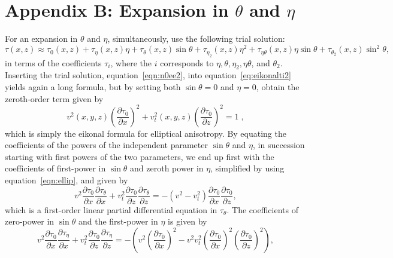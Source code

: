 \appendix
\section{Appendix B: Expansion in $\theta$ and $\eta$}

For an expansion in $\theta$ and $\eta$, simultaneously,   use the following trial solution:
 \begin{equation}
 \tau(x,z) \approx \tau_{0}(x,z) +\tau_{\eta}(x,z) \eta+\tau_{\theta}(x,z) \sin\theta+ \tau_{\eta_2}(x,z)  \eta^{2}+ \tau_{\eta \theta}(x,z)  \eta \sin\theta+ \tau_{\theta_2}(x,z)  \sin^{2}\theta,
\label{eqn:n0ee2}
\end{equation}
in terms of the coefficients $\tau_{i}$, where the $i$ corresponds to $\eta,\theta,\eta_2,\eta \theta$, and $\theta_2$. 
Inserting the trial solution, equation~\ref{eqn:n0ee2}, into equation~\ref{eq:eikonalti2} yields again a long formula, 
but by setting both $\sin\theta=0$ and $\eta=0$,
  obtain the zeroth-order term given by
\begin{equation}
v^2(x,y,z) \left(\frac{\partial \tau_{0}}{\partial x}\right)^2  +
v_t^2(x,y,z) \left(\frac{\partial \tau_{0}}{\partial z}\right)^2 = 1\;,
\label{eqn:ellip}
\end{equation}
which is simply the eikonal formula for elliptical anisotropy. By equating the coefficients of the powers 
of the independent parameter $\sin\theta$ and $\eta$, in succession starting with first powers of the two parameters,
we end up first with the coefficients of first-power in $\sin\theta$ and zeroth power in $\eta$, 
simplified by using equation~\ref{eqn:ellip}, and  given by
\begin{equation}
 v^2 \frac{\partial \tau_{0}}{\partial x} \frac{\partial \tau_{\theta}}{\partial x}+ v_t^2 \frac{\partial \tau_{0}}{\partial z} \frac{\partial \tau
   _{\theta}}{\partial z} = - \left(v^2-v_t^{2}\right)
   \frac{\partial \tau_{0}}{\partial x} \frac{\partial \tau_{0}}{\partial
   z},
\label{eqn:fordert}
\end{equation}
which is a first-order linear partial differential equation in $\tau_{\theta}$. The 
coefficients of zero-power in $\sin\theta$ and the first-power in $\eta$ is given by
\begin{equation}
v^2
   \frac{\partial \tau_{0}}{\partial x} \frac{\partial \tau_{\eta}}{\partial
   x}+v_t^2 \frac{\partial \tau _{0}}{\partial z} \frac{\partial \tau_{\eta}}{\partial z}  = -  \left(v^2 \left(\frac{\partial \tau_{0}}{\partial x}\right)^2-v^2
   v_t^2 \left(\frac{\partial \tau_{0}}{\partial x}\right)^2
   \left(\frac{\partial \tau_{0}}{\partial z}\right)^2\right),
\label{eqn:fordere}
\end{equation}
